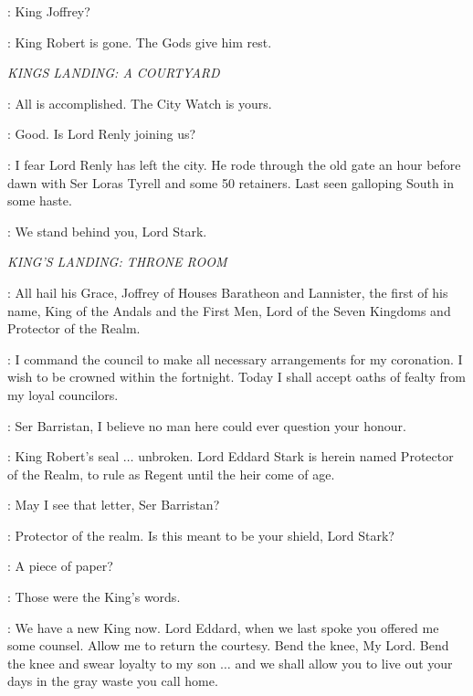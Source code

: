 \NED: King Joffrey? 

\PAGE: King Robert is gone. The Gods give him rest. 


\scene

\textit{KINGS LANDING: A COURTYARD} 


\LITTLEFINGER: All is accomplished. The City Watch is yours. 

\NED: Good. Is Lord Renly joining us? 

\VARYS: I fear Lord Renly has left the city. He rode through the old gate an hour before dawn with Ser Loras Tyrell and some 50 retainers. Last seen galloping South in some haste. 

\GOLDCLOAK: We stand behind you, Lord Stark. 



\scene

\textit{KING'S LANDING: THRONE ROOM} 


\PAGE:  All hail his Grace, Joffrey of Houses Baratheon and Lannister, the first of his name, King of the Andals and the First Men, Lord of the Seven Kingdoms and Protector of the Realm. 

\JOFFREY: I command the council to make all necessary arrangements for my coronation. I wish to be crowned within the fortnight. Today I shall accept oaths of fealty from my loyal councilors. 

\NED: Ser Barristan, I believe no man here could ever question your honour. 


\SELMY: King Robert's seal $\ldots$ unbroken. Lord Eddard Stark is herein named Protector of the Realm, to rule as Regent until the heir come of age. 

\CERSEI: May I see that letter, Ser Barristan?


\CERSEI: Protector of the realm. Is this meant to be your shield, Lord Stark? 

\CERSEI:  A piece of paper? 

\SELMY: Those were the King's words. 

\CERSEI: We have a new King now. Lord Eddard, when we last spoke you offered me some counsel. Allow me to return the courtesy. Bend the knee, My Lord. Bend the knee and swear loyalty to my son $\ldots$ and we shall allow you to live out your days in the gray waste you call home. 

